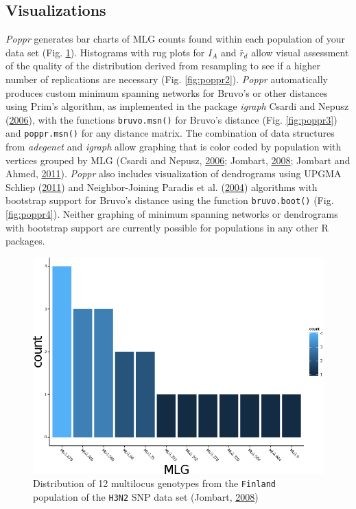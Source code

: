 \documentclass[double,12pt]{beavtex}
\begin{document}
  \subsection{Visualizations}\label{visualizations}
  
  \emph{Poppr} generates bar charts of MLG counts found within each
  population of your data set (Fig. \ref{fig:poppr1}). Histograms with rug
  plots for \(I_A\) and \(\bar{r}_d\) allow visual assessment of the
  quality of the distribution derived from resampling to see if a higher
  number of replications are necessary (Fig. \ref{fig:poppr2}).
  \emph{Poppr} automatically produces custom minimum spanning networks for
  Bruvo's or other distances using Prim's algorithm, as implemented in the
  package \emph{igraph} Csardi and Nepusz
  (\protect\hyperlink{ref-csardi2006igraph}{2006}), with the functions
  \texttt{bruvo.msn()} for Bruvo's distance (Fig. \ref{fig:poppr3}) and
  \texttt{poppr.msn()} for any distance matrix. The combination of data
  structures from \emph{adegenet} and \emph{igraph} allow graphing that is
  color coded by population with vertices grouped by MLG (Csardi and
  Nepusz, \protect\hyperlink{ref-csardi2006igraph}{2006}; Jombart,
  \protect\hyperlink{ref-Jombart_2008}{2008}; Jombart and Ahmed,
  \protect\hyperlink{ref-jombart2011adegenet}{2011}). \emph{Poppr} also
  includes visualization of dendrograms using UPGMA Schliep
  (\protect\hyperlink{ref-phangorn}{2011}) and Neighbor-Joining Paradis et
  al. (\protect\hyperlink{ref-paradis2004ape}{2004}) algorithms with
  bootstrap support for Bruvo's distance using the function
  \texttt{bruvo.boot()} (Fig. \ref{fig:poppr4}). Neither graphing of
  minimum spanning networks or dendrograms with bootstrap support are
  currently possible for populations in any other R packages.
  
  \begin{figure}
  
  {\centering \includegraphics[width=0.8\linewidth]{figure/poppr/Finland} 
  
  }
  
  \caption[Distribution of 12 multilocus genotypes from the \texttt{Finland}
  population of the \texttt{H3N2} SNP data set (Jombart,
  \protect\hyperlink{ref-Jombart_2008}{2008})]{Distribution of 12 multilocus genotypes from the \texttt{Finland}
  population of the \texttt{H3N2} SNP data set (Jombart,
  \protect\hyperlink{ref-Jombart_2008}{2008})}\label{fig:poppr1}
  \end{figure}
  
\end{document}
